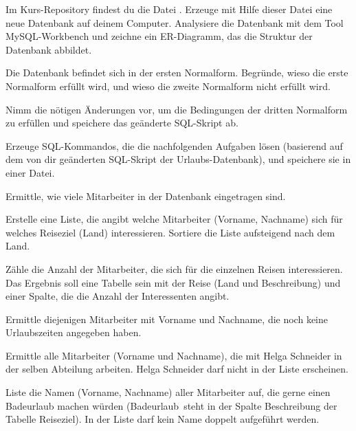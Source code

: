 \begin{compactenum}[a)]

\item Im Kurs-Repository findest du die Datei .
Erzeuge mit Hilfe dieser Datei eine neue Datenbank auf deinem Computer.
Analysiere die Datenbank mit dem Tool MySQL-Workbench und zeichne ein
ER-Diagramm, das die Struktur der Datenbank abbildet.

\item Die Datenbank befindet sich in der ersten Normalform. Begründe, wieso die
 erste Normalform erfüllt wird, und wieso die zweite Normalform nicht erfüllt wird.

\item Nimm die nötigen Änderungen vor, um die Bedingungen der dritten
Normalform zu erfüllen und speichere das geänderte SQL-Skript ab.

\item Erzeuge SQL-Kommandos, die die nachfolgenden Aufgaben lösen (basierend
auf dem von dir geänderten SQL-Skript der Urlaubs-Datenbank), und speichere sie
in einer Datei.

\begin{compactenum}[1.]
\item Ermittle, wie viele Mitarbeiter in der Datenbank eingetragen sind.

\item Erstelle eine Liste, die angibt welche Mitarbeiter (Vorname, Nachname)
sich für welches Reiseziel (Land) interessieren. Sortiere die Liste aufsteigend
nach dem Land.

\item Zähle die Anzahl der Mitarbeiter, die sich für die einzelnen Reisen
interessieren. Das Ergebnis soll eine Tabelle sein mit der Reise (Land und
Beschreibung) und einer Spalte, die die Anzahl der Interessenten angibt.

\item Ermittle diejenigen Mitarbeiter mit Vorname und Nachname, die noch keine
Urlaubszeiten angegeben haben.

\item Ermittle alle Mitarbeiter (Vorname und Nachname), die mit Helga Schneider
in der selben Abteilung arbeiten. Helga Schneider darf nicht in der Liste
erscheinen.

\item Liste die Namen (Vorname, Nachname) aller Mitarbeiter auf, die gerne einen
Badeurlaub machen würden (\glqq Badeurlaub\grqq\ steht in der Spalte
Beschreibung der Tabelle Reiseziel). In der Liste darf kein Name doppelt
aufgeführt werden.


\end{compactenum}
\end{compactenum}
